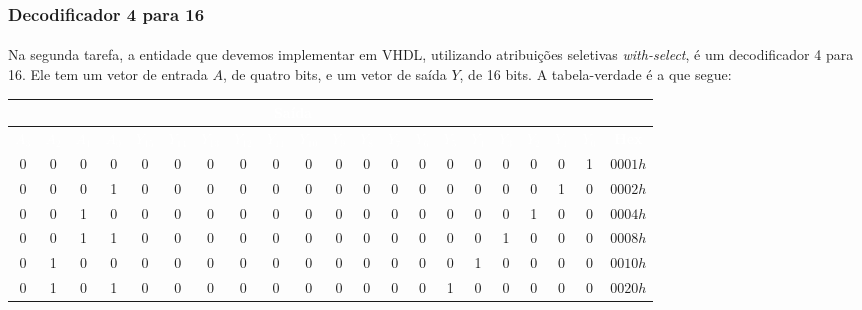 \documentclass[a4paper,12pt]{article}
\begin{document}
\subsubsection{Decodificador 4 para 16}
\paragraph{}
Na segunda tarefa, a entidade que devemos implementar em VHDL, utilizando atribuições seletivas \textit{with-select}, é um decodificador 4 para 16. Ele tem um vetor de entrada $A$, de quatro bits, e um vetor de saída $Y$, de 16 bits. A tabela-verdade é a que segue:

\begin{table}[H]
    \centering
    \footnotesize
    \setlength{\tabcolsep}{3pt}
    \begin{tabular}{|cccc|cccccccccccccccc|c|}
        \hline
        \rowcolor{black}
        \multicolumn{4}{|c|}{\textbf{\textcolor{white}{Entrada}}} & \multicolumn{17}{|c|}{\textbf{\textcolor{white}{Saída}}} \\ \hline
        \rowcolor{black}
        \textcolor{white}{$A_3$} & \textcolor{white}{$A_2$} & \textcolor{white}{$A_1$} & \textcolor{white}{$A_0$} & \textcolor{white}{$Y_{15}$} & \textcolor{white}{$Y_{14}$} & \textcolor{white}{$Y_{13}$} & \textcolor{white}{$Y_{12}$} & \textcolor{white}{$Y_{11}$} & \textcolor{white}{$Y_{10}$} & \textcolor{white}{$Y_9$} & \textcolor{white}{$Y_8$} & \textcolor{white}{$Y_7$} & \textcolor{white}{$Y_6$} & \textcolor{white}{$Y_5$} & \textcolor{white}{$Y_4$} & \textcolor{white}{$Y_3$} & \textcolor{white}{$Y_2$} & \textcolor{white}{$Y_1$} & \textcolor{white}{$Y_0$} & \textbf{\textcolor{white}{Hex}} \\ \hline
        0 & 0 & 0 & 0 & 0 & 0 & 0 & 0 &  0 & 0 & 0 & 0 & 0 & 0 & 0 & 0 &  0 & 0 & 0 & 1 & $0001h$ \\ \hline
        \rowcolor{cinza}
        0 & 0 & 0 & 1 & 0 & 0 & 0 & 0 & 0 & 0 & 0 & 0 & 0 & 0 & 0 & 0 & 0 & 0 & 1 & 0 & $0002h$ \\ \hline
        0 & 0 & 1 & 0 & 0 & 0 & 0 & 0 & 0 & 0 & 0 & 0 & 0 & 0 & 0 & 0 & 0 & 1 & 0 & 0 & $0004h$ \\ \hline
        \rowcolor{cinza}
        0 & 0 & 1 & 1 & 0 & 0 & 0 & 0 & 0 & 0 & 0 & 0 & 0 & 0 & 0 & 0 & 1 & 0 & 0 & 0 & $0008h$ \\ \hline
        0 & 1 & 0 & 0 & 0 & 0 & 0 & 0 & 0 & 0 & 0 & 0 & 0 & 0 & 0 & 1 & 0 & 0 & 0 & 0 & $0010h$ \\ \hline
        \rowcolor{cinza}
        0 & 1 & 0 & 1 & 0 & 0 & 0 & 0 & 0 & 0 & 0 & 0 & 0 & 0 & 1 & 0 & 0 & 0 & 0 & 0 & $0020h$ \\ \hline

\end{tabular}
\end{table}
\end{document}
